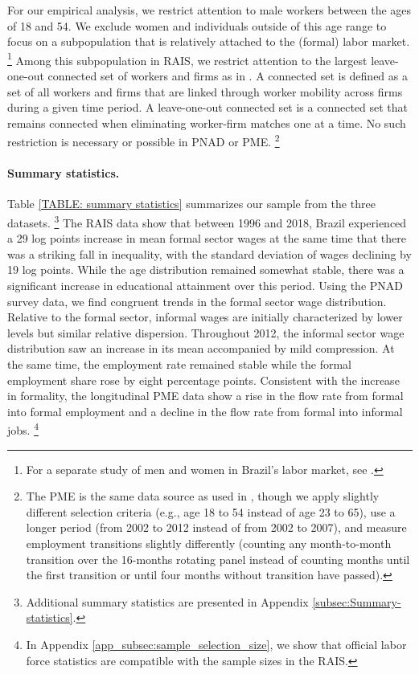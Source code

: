 For our empirical analysis, we restrict attention to male workers between the ages of 18 and 54. We exclude women and individuals outside of this age range to focus on a subpopulation that is relatively attached to the (formal) labor market.%
%
\footnote{For a separate study of men and women in Brazil's labor market, see \citet{MorchioMoser2020}.} %
%
Among this subpopulation in RAIS, we restrict attention to the largest leave-one-out connected set of workers and firms as in \citet*[][henceforth KSS]{KlineSaggioSolvsten2020}. A connected set is defined as a set of all workers and firms that are linked through worker mobility across firms during a given time period. A leave-one-out connected set is a connected set that remains connected when eliminating worker-firm matches one at a time. No such restriction is necessary or possible in PNAD or PME.%
%
\footnote{The PME is the same data source as used in \citet{MeghirNarita2015}, though we apply slightly different selection criteria (e.g., age 18 to 54 instead of age 23 to 65), use a longer period (from 2002 to 2012 instead of from 2002 to 2007), and measure employment transitions slightly differently (counting any month-to-month transition over the 16-months rotating panel instead of counting months until the first transition or until four months without transition have passed).} %
%


\paragraph{Summary statistics.}

Table \ref{TABLE: summary statistics} summarizes our sample from the three datasets.%
%
\footnote{Additional summary statistics are presented in Appendix \ref{subsec:Summary-statistics}.} %
%
The RAIS data show that between 1996 and 2018, Brazil experienced a 29 log points increase in mean formal sector wages at the same time that there was a striking fall in inequality, with the standard deviation of wages declining by 19 log points. While the age distribution remained somewhat stable, there was a significant increase in educational attainment over this period. Using the PNAD survey data, we find congruent trends in the formal sector wage distribution. Relative to the formal sector, informal wages are initially characterized by lower levels but similar relative dispersion. Throughout 2012, the informal sector wage distribution saw an increase in its mean accompanied by mild compression. At the same time, the employment rate remained stable while the formal employment share rose by eight percentage points. Consistent with the increase in formality, the longitudinal PME data show a rise in the flow rate from formal into formal employment and a decline in the flow rate from formal into informal jobs.%
%
\footnote{In Appendix \ref{app_subsec:sample_selection_size}, we show that official labor force statistics are compatible with the sample sizes in the RAIS.} %
%

